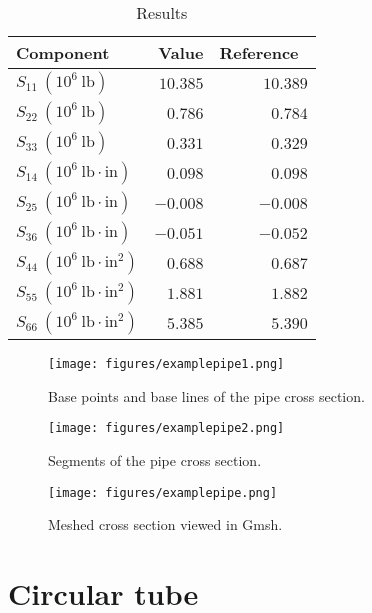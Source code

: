 \documentclass{book}
\begin{document}
\begin{table}[h]
  \centering
  \caption{Results}
  \begin{tabular}{lrr}
    \toprule
    Component & Value & Reference~\cite{yu2005} \\
    \midrule
    $S_{11}\ (10^6\ \mathrm{lb})$ & $10.385$ & $10.389$ \\
    $S_{22}\ (10^6\ \mathrm{lb})$ & $0.786$ & $0.784$ \\
    $S_{33}\ (10^6\ \mathrm{lb})$ & $0.331$ & $0.329$ \\
    $S_{14}\ (10^6\ \mathrm{lb \cdot in})$ & $0.098$ & $0.098$ \\
    $S_{25}\ (10^6\ \mathrm{lb \cdot in})$ & $-0.008$ & $-0.008$ \\
    $S_{36}\ (10^6\ \mathrm{lb \cdot in})$ & $-0.051$ & $-0.052$ \\
    $S_{44}\ (10^6\ \mathrm{lb \cdot in^2})$ & $0.688$ & $0.687$ \\
    $S_{55}\ (10^6\ \mathrm{lb \cdot in^2})$ & $1.881$ & $1.882$ \\
    $S_{66}\ (10^6\ \mathrm{lb \cdot in^2})$ & $5.385$ & $5.390$ \\
    \bottomrule
  \end{tabular}
  \label{table:pipe_results}
\end{table}



\begin{figure}[h]
  \centerline{\texttt{[image: figures/examplepipe1.png]}}
  \caption{Base points and base lines of the pipe cross section.}
  \label{fig:pipe1}
\end{figure}

\begin{figure}[h]
  \centerline{\texttt{[image: figures/examplepipe2.png]}}
  \caption{Segments of the pipe cross section.}
  \label{fig:pipe2}
\end{figure}

\begin{figure}[h]
  \centerline{\texttt{[image: figures/examplepipe.png]}}
  \caption{Meshed cross section viewed in Gmsh.}
  \label{fig:pipe}
\end{figure}




\clearpage
\section{Circular tube}
\label{eg:tube}
\end{document}
